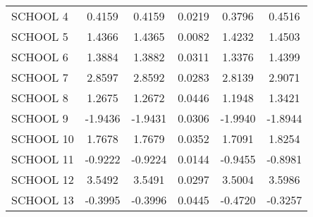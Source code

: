 \documentclass[12pt,letterpaper]{article}
\begin{document}
\begin{small}
\begin{table}[ht]
\begin{tabular}{l|ccccc}
  SCHOOL 4 & 0.4159 & 0.4159 & 0.0219 & 0.3796 & 0.4516 \\ 
  SCHOOL 5 & 1.4366 & 1.4365 & 0.0082 & 1.4232 & 1.4503 \\ 
  SCHOOL 6 & 1.3884 & 1.3882 & 0.0311 & 1.3376 & 1.4399 \\ 
  SCHOOL 7 & 2.8597 & 2.8592 & 0.0283 & 2.8139 & 2.9071 \\ 
  SCHOOL 8 & 1.2675 & 1.2672 & 0.0446 & 1.1948 & 1.3421 \\ 
  SCHOOL 9 & -1.9436 & -1.9431 & 0.0306 & -1.9940 & -1.8944 \\ 
  SCHOOL 10 & 1.7678 & 1.7679 & 0.0352 & 1.7091 & 1.8254 \\ 
  SCHOOL 11 & -0.9222 & -0.9224 & 0.0144 & -0.9455 & -0.8981 \\ 
  SCHOOL 12 & 3.5492 & 3.5491 & 0.0297 & 3.5004 & 3.5986 \\ 
  SCHOOL 13 & -0.3995 & -0.3996 & 0.0445 & -0.4720 & -0.3257 \\ 
   \hline
\end{tabular}
\end{table}



\end{small}
\end{document}
